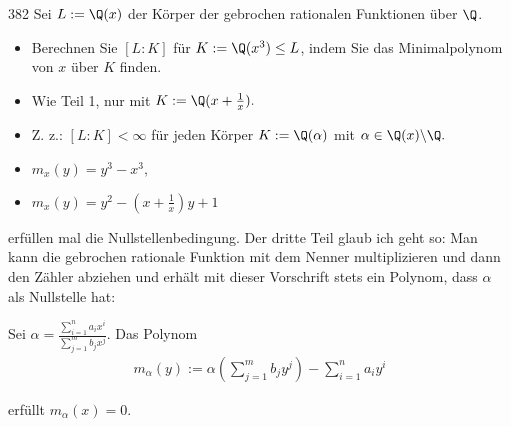 \begin{algebraUE}{382}
  Sei $L := \Q(x)$ der Körper der gebrochen rationalen Funktionen über $\Q$.
  \begin{itemize}
      \item Berechnen Sie $[L:K]$ für $K:= \Q(x^3) \leq L$, indem Sie das Minimalpolynom von $x$ über $K$ finden.
      \item Wie Teil 1, nur mit $K := \Q(x+\frac{1}{x}).$
      \item Z. z.: $[L:K] < \infty$ für jeden Körper $K := \Q(\alpha)$ mit $\alpha \in \Q(x) \backslash \Q.$
  \end{itemize}
\end{algebraUE}

\begin{solution}
  \begin{itemize}
      \item $m_x(y) = y^3 - x^3,$
      \item $m_x(y) = y^2 - (x + \frac{1}{x})y + 1$
  \end{itemize}
  erfüllen mal die Nullstellenbedingung. Der dritte Teil glaub ich geht so: Man kann die gebrochen rationale Funktion mit dem Nenner multiplizieren und dann den Zähler abziehen und erhält mit dieser Vorschrift stets ein Polynom, dass $\alpha$ als Nullstelle hat:

  Sei $\alpha = \frac{\sum_{i=1}^n a_i x^i}{\sum_{j=1}^m b_j x^j}$. Das Polynom
\begin{align}
m_\alpha(y) := \alpha \left(\sum_{j=1}^m b_j y^j\right) - \sum_{i=1}^n a_i y^i
\end{align}

erfüllt $m_\alpha(x) = 0.$
\end{solution}
